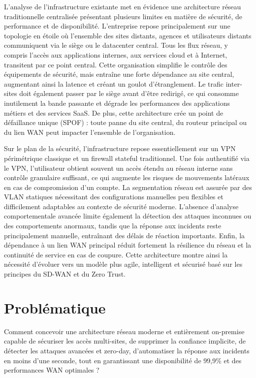 \documentclass[12pt,a4paper,oneside]{report}
\begin{document}
	L'analyse de l'infrastructure existante met en évidence une architecture réseau traditionnelle centralisée présentant plusieurs limites en matière de sécurité, de performance et de disponibilité. L'entreprise repose principalement sur une topologie en étoile où l'ensemble des sites distants, agences et utilisateurs distants communiquent via le siège ou le datacenter central. Tous les flux réseau, y compris l'accès aux applications internes, aux services cloud et à Internet, transitent par ce point central. Cette organisation simplifie le contrôle des équipements de sécurité, mais entraîne une forte dépendance au site central, augmentant ainsi la latence et créant un goulot d'étranglement. Le trafic inter-sites doit également passer par le siège avant d'être redirigé, ce qui consomme inutilement la bande passante et dégrade les performances des applications métiers et des services SaaS. De plus, cette architecture crée un point de défaillance unique (SPOF) : toute panne du site central, du routeur principal ou du lien WAN peut impacter l'ensemble de l'organisation.
	
	Sur le plan de la sécurité, l'infrastructure repose essentiellement sur un VPN périmétrique classique et un firewall stateful traditionnel. Une fois authentifié via le VPN, l'utilisateur obtient souvent un accès étendu au réseau interne sans contrôle granulaire suffisant, ce qui augmente les risques de mouvements latéraux en cas de compromission d'un compte. La segmentation réseau est assurée par des VLAN statiques nécessitant des configurations manuelles peu flexibles et difficilement adaptables au contexte de sécurité moderne. L'absence d'analyse comportementale avancée limite également la détection des attaques inconnues ou des comportements anormaux, tandis que la réponse aux incidents reste principalement manuelle, entraînant des délais de réaction importants. Enfin, la dépendance à un lien WAN principal réduit fortement la résilience du réseau et la continuité de service en cas de coupure. Cette architecture montre ainsi la nécessité d'évoluer vers un modèle plus agile, intelligent et sécurisé basé sur les principes du SD-WAN et du Zero Trust.
	\section{Problématique}
	Comment concevoir une architecture réseau moderne et entièrement on-premise capable de sécuriser les accès multi-sites, de supprimer la confiance implicite, de détecter les attaques avancées et zero-day, d'automatiser la réponse aux incidents en moins d'une seconde, tout en garantissant une disponibilité de 99,9\% et des performances WAN optimales ?
\end{document}
